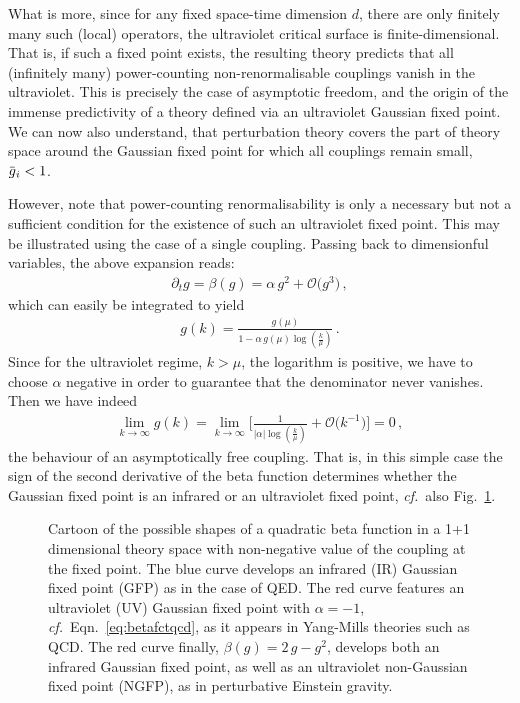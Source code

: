 \documentclass[11pt]{book}
\newcommand{\overbar}[1]{\mkern 1.5mu\overline{\mkern-1.5mu#1\mkern-1.5mu}\mkern 1.5mu}
\newcommand\cf{\textit{cf.}\ }
\numberwithin{equation}{chapter}
\begin{document}
What is more, since for any fixed space-time dimension $d$,
there are only finitely many such (local) operators,
the ultraviolet critical surface is finite-dimensional.
That is, if such a fixed point exists, the resulting theory predicts
that all (infinitely many) power-counting non-renormalisable couplings
vanish in the ultraviolet. This is precisely the case of asymptotic
freedom, and the origin of the immense predictivity of a theory
defined via an ultraviolet Gaussian fixed point.
We can now also understand, that perturbation theory covers
the part of theory space around the Gaussian fixed point
for which all couplings remain small, $\overbar g_i < 1$.

However, note that power-counting renormalisability is only a
necessary but not a sufficient condition for the existence of such an ultraviolet
fixed point. This may be illustrated using the case of a single
coupling. Passing back to dimensionful variables, the above expansion
reads:
\begin{align}
  \partial_t g =
  \beta(g) =
  \alpha \, g^2
  + \mathcal O \big( g^3 \big) \,,
  \label{eq:betafctqcd}
\end{align}
which can easily be integrated to yield
\begin{align}
  g(k) =
  \frac{
    g(\mu)
  }{
    1 - \alpha \, g(\mu) \log \left( \frac k{\mu} \right)
  } \,.
\end{align}
Since for the ultraviolet regime, $k>\mu$, the logarithm
is positive, we have to choose $\alpha$ negative
in order to guarantee that the denominator never
vanishes. Then we have indeed
\begin{align}
  \lim_{k \rightarrow \infty}
  g(k) =
  \lim_{k \rightarrow \infty}
  \Bigg[
    \frac{ 1 }{ | \alpha | \log \left( \frac k{\mu} \right) }
    + \mathcal O \big( k^{-1} \big)
  \Bigg]
  = 0 \,,
\end{align}
the behaviour of an asymptotically free coupling.
That is, in this simple case the sign of the second
derivative of the beta function determines whether
the Gaussian fixed point is an infrared or an ultraviolet
fixed point, \cf also Fig.~\ref{fig:shapesbetafunctions}.

\begin{figure}
  \begin{center}
    
  \end{center}
  \vspace*{-5mm}
  \caption{
    Cartoon of the possible shapes of a quadratic beta function
    in a 1+1 dimensional theory space with non-negative
    value of the coupling at the fixed point.
    The blue curve develops
    an infrared (IR) Gaussian fixed point (GFP) as in the case of QED.
    The red curve features an ultraviolet (UV) Gaussian fixed point
    with $\alpha = -1$, \cf Eqn.~\eqref{eq:betafctqcd}, as it
    appears in Yang-Mills theories such as QCD.
    The red curve finally, $\beta(g) = 2 \, g - g^2$, develops
    both an infrared Gaussian fixed point, as well as an
    ultraviolet non-Gaussian fixed point (NGFP),
    as in perturbative Einstein gravity.
  }
  \label{fig:shapesbetafunctions}
\end{figure}
\end{document}
